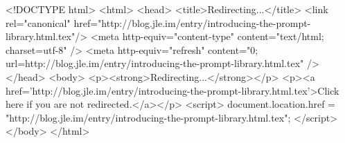 <!DOCTYPE html>
<html>
<head>
<title>Redirecting...</title>
<link rel="canonical" href="http://blog.jle.im/entry/introducing-the-prompt-library.html.tex"/>
<meta http-equiv="content-type" content="text/html; charset=utf-8" />
<meta http-equiv="refresh" content="0; url=http://blog.jle.im/entry/introducing-the-prompt-library.html.tex" />
</head>
<body>
  <p><strong>Redirecting...</strong></p>
  <p><a href='http://blog.jle.im/entry/introducing-the-prompt-library.html.tex'>Click here if you are not redirected.</a></p>
  <script>
    document.location.href = "http://blog.jle.im/entry/introducing-the-prompt-library.html.tex";
  </script>
</body>
</html>

